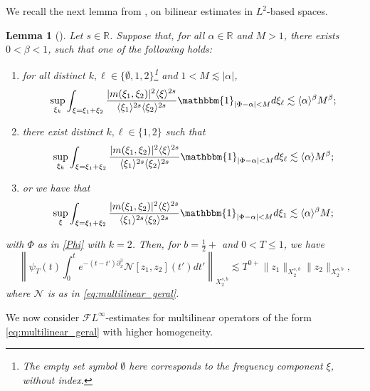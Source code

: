 \documentclass[a4paper,
11pt,  reqno]{amsart}
\newcommand{\jap}[1]{\langle #1 \rangle}
\newcommand{\5}{\textup{V}}
\newcommand{\noi}{\noindent}
\newcommand{\FL}{\mathcal{F} L}
\newtheorem{lemma}[theorem]{Lemma}
\theoremstyle{remark}
\newcommand{\R}{\mathbb{R}}
\newcommand{\al}{\alpha}
\renewcommand{\l}{\ell}
\numberwithin{equation}{section}
\numberwithin{theorem}{section}
\newcommand{\Ncal}{\mathcal{N}}
\begin{document}
We recall the next lemma from \cite{CLS}, on bilinear estimates in $L^2$-based spaces.
		\begin{lemma}[{\cite[Lemma 3.1]{CLS}}]\label{lem:fre_bi}
            Let $s\in\R$.
			Suppose that, for all $\al\in \R$ and $M>1$, there exists $0<\beta<1$, such that one of the following holds:
			\begin{enumerate}
				\item[(i)] for all distinct $ k, \l\in\{\emptyset,1,2\}$\footnote{The empty set symbol $\emptyset$ here corresponds to the frequency component $\xi$, without index.}
                and $1<M\lesssim |\alpha|$,
				\begin{equation}\label{eq:frequad}
					\sup_{\xi_k}\int_{\xi=\xi_1+\xi_2}
                    \frac{|m(\xi_1,\xi_2)|^2\jap{\xi}^{2s}}{\jap{\xi_{1}}^{2s}\jap{\xi_{2}}^{2s}}\mathbbm{1}_{|\Phi-\alpha|<M} d\xi_{\l} \lesssim \jap{\alpha}^\beta M^\beta;
				\end{equation}


				\item[(ii)]
                there exist distinct $k, \l\in\{1,2\}$ such that
				\begin{equation}\label{eq:frequad2}
					\sup_{\xi_k}\int_{\xi=\xi_1+\xi_2}
                    \frac{|m(\xi_1,\xi_2)|^2\jap{\xi}^{2s}}{\jap{\xi_{1}}^{2s}\jap{\xi_{2}}^{2s}}\mathbbm{1}_{|\Phi-\alpha|<M} d\xi_{\l}  \lesssim \jap{\alpha} M^\beta;
				\end{equation}


				\item[(iii)] or we have that
				\begin{equation}\label{eq:frequad3}
					\sup_{\xi}\int_{\xi=\xi_1+\xi_2}\frac{|m(\xi_1,\xi_2)|^2\jap{\xi}^{2s}}{\jap{\xi_{1}}^{2s}\jap{\xi_{2}}^{2s}}\mathbbm{1}_{|\Phi-\alpha|<M} d\xi_{1}  \lesssim \jap{\alpha}^\beta M;
				\end{equation}
			\end{enumerate}

            \noi with $\Phi$ as in \eqref{Phi} with $k=2$.
			Then, for $b=\frac12+$ and $0<T \le 1$, we have
			\begin{equation}
				\left\|\psi_T (t)\int_0^te^{-(t-t')\partial_x^3} \Ncal[z_1,z_2](t')dt'\right\|_{X^{s,b}_{2}} \lesssim T^{0+}\|z_1\|_{X^{s,b}_{2}} \|z_2\|_{X^{s,b}_{2}},
			\end{equation}
            where $\Ncal$ is as in \eqref{eq:multilinear_geral}.
		\end{lemma}


		We now consider $\FL^{\infty}$-estimates for multilinear operators of the form \eqref{eq:multilinear_geral} with higher homogeneity.
\end{document}
